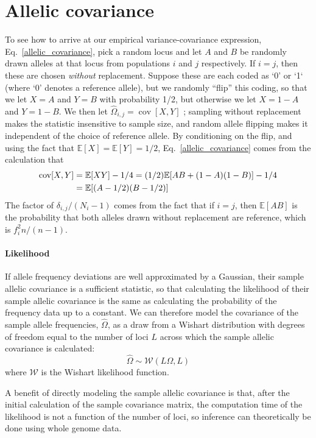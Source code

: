 \documentclass[10pt,letterpaper]{article}
\newcommand{\E}{\mathbb{E}}
\newcommand{\cov}{\mathop{\mbox{cov}}}
\begin{document}
\section*{Allelic covariance}\label{allelic_cov}
To see how to arrive at our empirical variance-covariance expression, Eq.\ \eqref{allelic_covariance},
pick a random locus and
let $A$ and $B$ be randomly drawn alleles at that locus from populations $i$ and $j$ respectively.
If $i=j$, then these are chosen \emph{without} replacement.
Suppose these are each coded as `0' or `1` (where `0' denotes a reference allele),
but we randomly ``flip'' this coding, so that we let $X=A$ and $Y=B$ with probability 1/2,
but otherwise we let $X=1-A$ and $Y=1-B$.
We then let $\widehat{\Omega}_{i,j} = \cov[X,Y]$ ; 
sampling without replacement makes the statistic insensitive to sample size,
and random allele flipping makes it independent of the choice of reference allele.
By conditioning on the flip,
and using the fact that $\E[X] = \E[Y] = 1/2$,
Eq.\ \eqref{allelic_covariance} comes from the calculation that
\begin{align}
\cov[X,Y] &= \E[XY] - 1/4 = (1/2)\E[AB + (1-A)(1-B)] - 1/4\\\notag
&= \E[(A-1/2)(B-1/2)]
\end{align}
The factor of $\delta_{i,j}/(N_i-1)$ comes from the fact that if $i=j$,
then $\E[AB]$ is the probability that both alleles drawn without replacement are reference,
which is $f_i^2 n/(n-1)$.

\paragraph{Likelihood}
If allele frequency deviations are well approximated by a Gaussian, 
their sample allelic covariance is a sufficient statistic,
so that calculating the likelihood of their sample allelic covariance is the same as 
calculating the probability of the frequency data up to a constant. 
We can therefore model the covariance of the sample allele frequencies, $\widehat{\Omega}$, 
as a draw from a Wishart distribution with degrees of freedom equal to 
the number of loci $L$ across which the sample allelic covariance is calculated:
\begin{equation}
\widehat{\Omega} \sim \mathcal{W}\left( L\Omega, L	\right) 
\label{wishart}
\end{equation}
where $\mathcal{W}$ is the Wishart likelihood function.

A benefit of directly modeling the sample allelic covariance is that, 
after the initial calculation of the sample covariance matrix,
the computation time of the likelihood is not a function of the number of loci,
so inference can theoretically be done using whole genome data.
\end{document}
